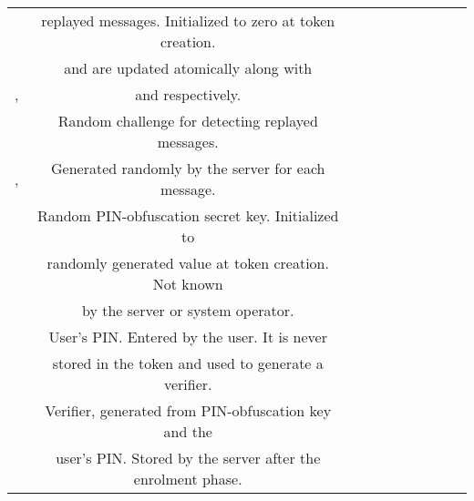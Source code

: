 \begin{table}[!h]
\begin{scriptsize}
{{\begin{tabular}{|c|c|c|c|c|c|c|c|c|c|}
    \cellcolor{white!20}\scriptsize &\cellcolor{white!20}\scriptsize   replayed messages.  Initialized to zero at token creation.\\ 

\cellcolor{white!20}\scriptsize &\cellcolor{white!20}\scriptsize  \VC{\counter} and \VS{\counter} are updated atomically along with\\ 

\multirow{-4}{*}{\cellcolor{white!20}\scriptsize  \VC{\counter}, \VS{\counter}  }&\cellcolor{white!20}\scriptsize  \VC{\state} and \VS{\state} respectively.\\   



\cellcolor{gray!20}\scriptsize &\cellcolor{gray!20}\scriptsize   Random challenge for detecting replayed messages.\\ 

\multirow{-2}{*}{\cellcolor{gray!20}\scriptsize   \VS{\nonce}, \VM{\nonce}  }&\cellcolor{gray!20}\scriptsize  Generated randomly by the server for each message.\\   



\cellcolor{white!20}\scriptsize &\cellcolor{white!20}\scriptsize   Random PIN-obfuscation secret key. Initialized to\\ 


\cellcolor{white!20}\scriptsize &\cellcolor{white!20}\scriptsize   randomly generated value at token creation. Not known \\ 


\multirow{-3}{*}{\cellcolor{white!20}\scriptsize  \VC{\salt}}&\cellcolor{white!20}\scriptsize  by  the server or system operator.\\   



\cellcolor{gray!20}\scriptsize &\cellcolor{gray!20}\scriptsize   User's PIN.  Entered by the user. It is never \\ 


\multirow{-2}{*}{\cellcolor{gray!20}\scriptsize  \VC{\pin}}&\cellcolor{gray!20}\scriptsize  stored in the token and used to generate a verifier.\\   

      
  \cellcolor{white!20}\scriptsize &\cellcolor{white!20}\scriptsize   Verifier, generated from PIN-obfuscation key and the\\ 


\cellcolor{white!20}\scriptsize &\cellcolor{white!20}\scriptsize   user's PIN.  Stored by the server after the enrolment phase. \\ 



\end{tabular}}}
\end{scriptsize}
\end{table}

